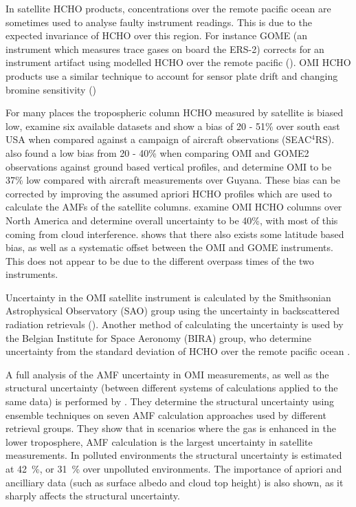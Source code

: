       In satellite HCHO products, concentrations over the remote pacific ocean are sometimes used to analyse faulty instrument readings.
      This is due to the expected invariance of HCHO over this region.
      For instance GOME (an instrument which measures trace gases on board the ERS-2) corrects for an instrument artifact using modelled HCHO over the remote pacific (\cite{Shim2005}).
      OMI HCHO products use a similar technique to account for sensor plate drift and changing bromine sensitivity (\cite{Abad2015})
      
      
      For many places the tropospheric column HCHO measured by satellite is biased low, \cite{Zhu2016} examine six available datasets and show a bias of 20 - 51\% over south east USA when compared against a campaign of aircraft observations (SEAC$^4$RS).
      \cite{DeSmedt2015} also found a low bias from 20 - 40\% when comparing OMI and GOME2 observations against ground based vertical profiles, and \cite{Barkley2013} determine OMI to be 37\% low compared with aircraft measurements over Guyana.
      These bias can be corrected by improving the assumed apriori HCHO profiles which are used to calculate the AMFs of the satellite columns.
      \cite{Millet2006} examine OMI HCHO columns over North America and determine overall uncertainty to be 40\%, with most of this coming from cloud interference.
      \cite{Millet2008} shows that there also exists some latitude based bias, as well as a systematic offset between the OMI and GOME instruments.
      This does not appear to be due to the different overpass times of the two instruments.
      
      Uncertainty in the OMI satellite instrument is calculated by the Smithsonian Astrophysical Observatory (SAO) group using the uncertainty in backscattered radiation retrievals (\cite{Abad2015, Abad2016}).
      Another method of calculating the uncertainty is used by the Belgian Institute for Space Aeronomy (BIRA) group, who determine uncertainty from the standard deviation of HCHO over the remote pacific ocean \citep{DeSmedt2012, DeSmedt2015}.
      
      A full analysis of the AMF uncertainty in OMI measurements, as well as the structural uncertainty (between different systems of calculations applied to the same data) is performed by \cite{Lorente2017}.
      They determine the structural uncertainty using ensemble techniques on seven AMF calculation approaches used by different retrieval groups.
      They show that in scenarios where the gas is enhanced in the lower troposphere, AMF calculation is the largest uncertainty in satellite measurements.
      In polluted environments the structural uncertainty is estimated at 42~\%, or 31~\% over unpolluted environments.
      The importance of apriori and ancilliary data (such as surface albedo and cloud top height) is also shown, as it sharply affects the structural uncertainty.
      
